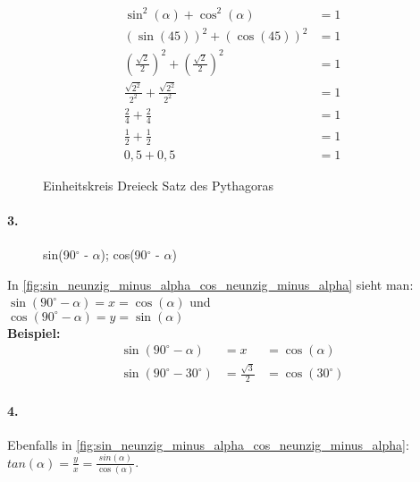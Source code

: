 \documentclass{standalone}
\begin{document}
\begin{align}
	\sin^2(\alpha) + \cos^2(\alpha)                                       & = 1 \tag{1}  \\
	(\sin(45))^2 + (\cos(45))^2                                           & = 1  \tag{2} \\
	\left(\frac{\sqrt{2}}{2}\right)^2 + \left(\frac{\sqrt{2}}{2}\right)^2 & = 1 \tag{3}  \\
	\frac{\sqrt{2^2}}{2^2} + \frac{\sqrt{2^2}}{2^2}                       & = 1 \tag{4}  \\
	\frac{2}{4} + \frac{2}{4}                                             & = 1 \tag{5}  \\
	\frac{1}{2} + \frac{1}{2}                                             & = 1 \tag{6}  \\
	0,5 + 0,5                                                             & = 1 \tag{7}
\end{align}

\begin{figure}[hb!]
	\centering
	\def\svgwidth{200px}
	
	\caption{Einheitskreis Dreieck Satz des Pythagoras}
	\label{fig:einheitskreis_dreieck_pythagoras}
\end{figure}

\paragraph{3.}

\begin{wrapfigure}[6]{r}{0.45\textwidth}
	\def\svgwidth{200px}
	
	\caption{sin(90$^\circ$ - $\alpha$); cos(90$^\circ$ - $\alpha$)}
	\label{fig:sin_neunzig_minus_alpha_cos_neunzig_minus_alpha}
\end{wrapfigure}

In \autoref{fig:sin_neunzig_minus_alpha_cos_neunzig_minus_alpha} sieht man: \\
$\sin(90^\circ - \alpha) = x = \cos(\alpha)$ und \\
$\cos(90^\circ - \alpha) = y = \sin(\alpha)$ \\
\textbf{Beispiel:}
\begin{align}
	\sin(90^\circ - \alpha)   & = x                   & = \cos(\alpha) \tag{1}   \\
	\sin(90^\circ - 30^\circ) & =  \frac{\sqrt{3}}{2} & = \cos(30^\circ) \tag{2}
\end{align}

\paragraph{4.}

Ebenfalls in \autoref{fig:sin_neunzig_minus_alpha_cos_neunzig_minus_alpha}:\\
$tan(\alpha) = \frac{y}{x} = \frac{sin(\alpha)}{\cos(\alpha)}$.
\end{document}
